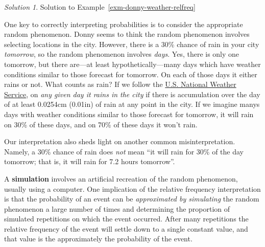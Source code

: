 \documentclass[
  letterpaper,
  DIV=11,
  numbers=noendperiod]{scrreprt}
\theoremstyle{plain}
\theoremstyle{definition}
\theoremstyle{definition}
\theoremstyle{definition}
\theoremstyle{remark}
\newtheorem{refsolution}{Solution}[chapter]
\begin{document}
\begin{tcolorbox}[enhanced jigsaw, opacityback=0, rightrule=.15mm, coltitle=black, colframe=quarto-callout-tip-color-frame, toprule=.15mm, colbacktitle=quarto-callout-tip-color!10!white, opacitybacktitle=0.6, left=2mm, toptitle=1mm, breakable, title={Solution (click to expand)}, bottomtitle=1mm, colback=white, leftrule=.75mm, titlerule=0mm, arc=.35mm, bottomrule=.15mm]

\begin{refsolution}
Solution to Example~\ref{exm-donny-weather-relfreq}

One key to correctly interpreting probabilities is to consider the
appropriate random phenomenon. Donny seems to think the random
phenomenon involves selecting locations in the city. However, there is a
30\% chance of rain in your city \emph{tomorrow}, so the random
phenomenon involves \emph{days}. Yes, there is only one tomorrow, but
there are---at least hypothetically---many days which have weather
conditions similar to those forecast for tomorrow. On each of those days
it either rains or not. What counts as rain? If we follow the
\href{https://www.weather.gov/media/pah/WeatherEducation/pop.pdf}{U.S.
National Weather Service}, on \emph{any given day it rains in the city}
if there is accumulation over the day of at least 0.0254cm (0.01in) of
rain at any point in the city. If we imagine manys days with weather
conditions similar to those forecast for tomorrow, it will rain on 30\%
of these days, and on 70\% of these days it won't rain.

Our interpretation also sheds light on another common misinterpretation.
Namely, a 30\% chance of rain does \emph{not} mean ``it will rain for
30\% of the day tomorrow; that is, it will rain for 7.2 hours
tomorrow''.

\label{sol-donny-weather-relfreq}

\end{refsolution}

\end{tcolorbox}

A \textbf{simulation} involves an artificial recreation of the random
phenomenon, usually using a computer. One implication of the relative
frequency interpretation is that the probability of an event can be
\emph{approximated by simulating} the random phenomenon a large number
of times and determining the proportion of simulated repetitions on
which the event occurred. After many repetitions the relative frequency
of the event will settle down to a single constant value, and that value
is the approximately the probability of the event.
\end{document}
